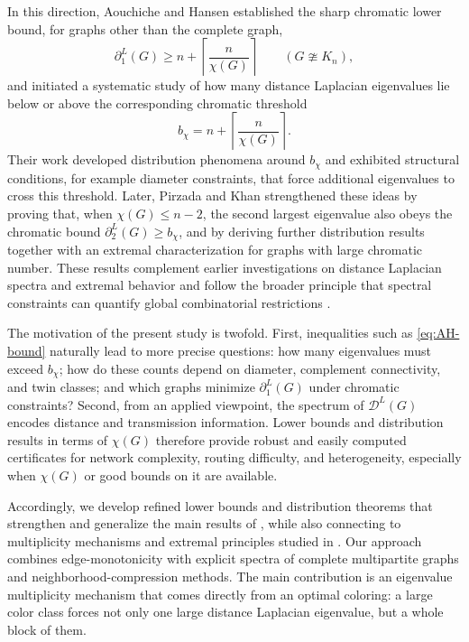 \documentclass[12pt]{article}
\newcommand{\DL}{\mathcal{D}^{L}}
\newcommand{\ceil}[1]{\left\lceil #1 \right\rceil}
\theoremstyle{plain}
\theoremstyle{definition}
\begin{document}
In this direction, Aouchiche and Hansen \cite{AouchicheHansen2017} established the sharp chromatic lower bound, for graphs
other than the complete graph,
\begin{equation}\label{eq:AH-bound}
    \partial^{L}_1(G) \ge n+\ceil{\frac{n}{\chi(G)}}\qquad (G\ncong K_n),
\end{equation}
and initiated a systematic study of how many distance Laplacian eigenvalues lie below or above the corresponding chromatic
threshold
\[
    b_\chi=n+\ceil{\frac{n}{\chi(G)}}.
\]
Their work \cite{AouchicheHansen2017} developed distribution phenomena around $b_\chi$ and exhibited structural conditions,
for example diameter constraints, that force additional eigenvalues to cross this threshold. Later, Pirzada and Khan
\cite{PirzadaKhan2021} strengthened these ideas by proving that, when $\chi(G)\le n-2$, the second largest eigenvalue also
obeys the chromatic bound $\partial^{L}_2(G)\ge b_\chi$, and by deriving further distribution results together with an extremal
characterization for graphs with large chromatic number. These results complement earlier investigations on distance Laplacian
spectra and extremal behavior
\cite{AouchicheHansen2013,AouchicheHansen2014,LinWuChenShu2016,NathPaul2014,FernandesEtAl2018,NiuFanWang2015,bilalacta,bilalijpam}
and follow the broader principle that spectral constraints can quantify global combinatorial restrictions
\cite{BrouwerHaemers2012,CvetkovicDoobSachs1995}.

The motivation of the present study is twofold. First, inequalities such as \eqref{eq:AH-bound} naturally lead to more precise
questions: how many eigenvalues must exceed $b_\chi$; how do these counts depend on diameter, complement connectivity, and twin
classes; and which graphs minimize $\partial^{L}_1(G)$ under chromatic constraints? Second, from an applied viewpoint, the
spectrum of $\DL(G)$ encodes distance and transmission information. Lower bounds and distribution results in terms of
$\chi(G)$ therefore provide robust and easily computed certificates for network complexity, routing difficulty, and heterogeneity,
especially when $\chi(G)$ or good bounds on it are available.

Accordingly, we develop refined lower bounds and distribution theorems that strengthen and generalize the main results of
\cite{AouchicheHansen2017,PirzadaKhan2021}, while also connecting to multiplicity mechanisms and extremal principles studied in
\cite{AouchicheHansen2013,AouchicheHansen2014,LinWuChenShu2016,NathPaul2014,FernandesEtAl2018,NiuFanWang2015}. Our approach
combines edge-monotonicity with explicit spectra of complete multipartite graphs and neighborhood-compression methods. The main
contribution is an eigenvalue multiplicity mechanism that comes directly from an optimal coloring: a large color class forces not
only one large distance Laplacian eigenvalue, but a whole block of them.
\end{document}
